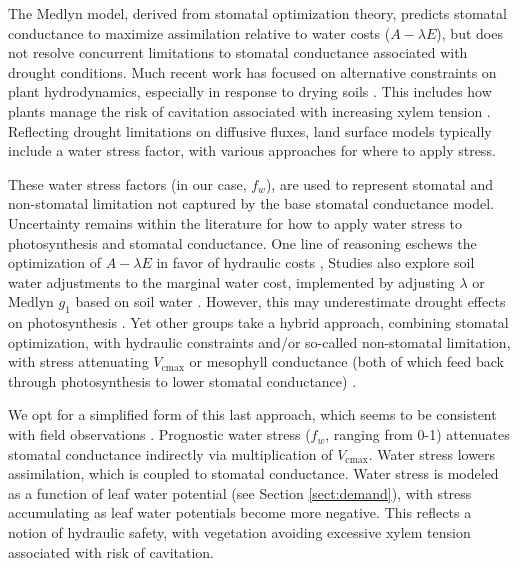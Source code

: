 \documentclass[draft,linenumbers]{agujournal}
\begin{document}
    The Medlyn model, derived from stomatal optimization theory, predicts stomatal conductance to maximize assimilation relative to water costs ($A-\lambda E$), 
    but does not resolve concurrent limitations to stomatal conductance associated with drought conditions.
    Much recent work has focused on alternative constraints on plant hydrodynamics, especially in response to drying soils \citep{manzoni2013b,novick2016a,zhou2014}.
    This includes how plants manage the risk of cavitation associated with increasing xylem tension \citep{sperry1998}.
    Reflecting drought limitations on diffusive fluxes, land surface models typically include a water stress factor, with various approaches for where to apply stress.
    
    These water stress factors (in our case, $f_w$), are used to represent stomatal and non-stomatal limitation not captured by the base stomatal conductance model.
    Uncertainty remains within the literature for how to apply water stress to photosynthesis and stomatal conductance.
    One line of reasoning eschews the optimization of $A-\lambda E$ in favor of hydraulic costs \citep{sperry2017},
    Studies also explore soil water adjustments to the marginal water cost, implemented by adjusting $\lambda$ or Medlyn $g_1$ based on soil water \citep{manzoni2013b}.
    However, this may underestimate drought effects on photosynthesis \citep{zhou2013,lin2018}.
    Yet other groups take a hybrid approach, combining stomatal optimization, with hydraulic constraints and/or
    so-called non-stomatal limitation, with stress attenuating $V_{\text{cmax}}$ or mesophyll conductance 
    (both of which feed back through photosynthesis to lower stomatal conductance) \citep{egea2011,novick2016a}.
    
    We opt for a simplified form of this last approach, which seems to be consistent with field observations \citep{lin2018}.
    Prognostic water stress ($f_w$, ranging from 0-1) attenuates stomatal conductance indirectly via multiplication of $V_{\text{cmax}}$.
    Water stress lowers assimilation, which is coupled to stomatal conductance.
    Water stress is modeled as a function of leaf water potential (see Section \ref{sect:demand}), with stress accumulating as leaf water potentials become more negative.
    This reflects a notion of hydraulic safety, with vegetation avoiding excessive xylem tension associated with risk of cavitation.
    
\end{document}
